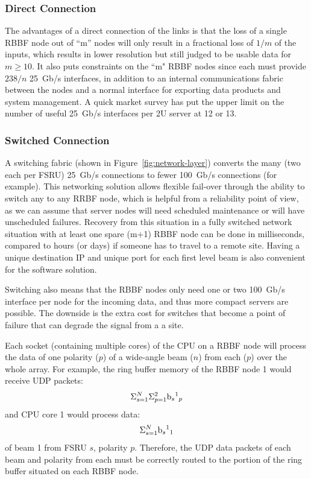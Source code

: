 \documentclass[12pt,a4paper]{article}
\begin{document}
\subsubsection{Direct Connection}  \label{ssec:direct}
The advantages of a direct connection of the \fsru links is that the loss of a single RBBF node out of ``m'' nodes will only result in a fractional loss of $1/m$ of the inputs, which results in lower resolution but still judged to be usable data for $m \geq 10$. 
It also puts constraints on the ``m" RBBF nodes since each must provide $238/n$ 25~Gb/s interfaces, in addition to an internal communications fabric between the nodes and a normal interface for exporting data products and system management. 
A quick market survey has put the upper limit on the number of useful 25~Gb/s interfaces per 2U server at 12 or 13.

\subsubsection{Switched Connection}
A switching fabric (shown in Figure~\ref{fig:network-layer}) converts the many (two each per FSRU) 25~Gb/s connections to fewer 100~Gb/s connections (for example).
This networking solution allows flexible fail-over through the ability to switch any \fsru to any RRBF node, which is helpful from a reliability point of view, as we can assume that server nodes will need scheduled maintenance or will have unscheduled failures.
Recovery from this situation in a fully switched network situation with at least one spare (m+1) RBBF node can be done in milliseconds, compared to hours (or days) if someone has to travel to a remote site. 
Having a unique destination IP and unique port for each first level beam is also convenient for the software solution.

Switching also means that the RBBF nodes only need one or two 100~Gb/s interface per node for the incoming data, and thus more compact servers are possible.
The downside is the extra cost for switches that become a point of failure that can degrade the signal from a a site.

Each socket (containing multiple cores) of the CPU on a RBBF node will process the data of one polarity ($p$) of a wide-angle beam ($n$) from each \fsru ($p$) over the whole array.
For example, the ring buffer memory of the  RBBF node 1 would receive UDP packets:
\[
\Sigma^{N}_{s=1} \Sigma^{2}_{p=1} {\rm b} {_s} {^1} {_p}
\]
and CPU core 1 would process data:
\[
\Sigma^{N}_{s=1} {\rm b} {_s} {^1} {_1}
\]
of beam 1 from FSRU $s$, polarity $p$.
Therefore, the UDP data packets of each beam and polarity from each \fsru must be correctly routed to the portion of the ring buffer situated on each RBBF node.
\end{document}
